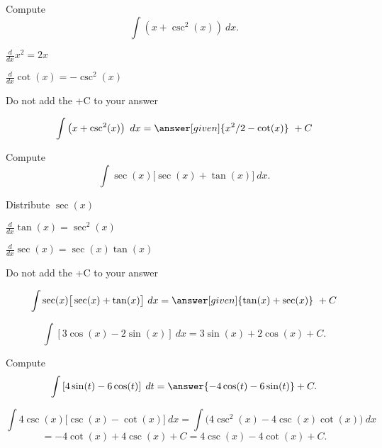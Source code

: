 \documentclass{ximera}
\begin{document}
\begin{problem} %
Compute
\[
\int \left(x + \csc^2(x) \right) \ dx.
\]

\begin{hint}
$\frac{d}{dx} x^2 = 2x$
\end{hint}
\begin{hint}
$\frac{d}{dx} \cot(x) = -\csc^2(x)$
\end{hint}
\begin{hint}
\begin{center}
Do not add the +C to your answer
\end{center}
\end{hint}

\[
\int \left(x + \csc^2(x) \right) \ dx =
\answer[given]{x^2 /2 - \cot(x)} \ +  C
\]
\end{problem}

\begin{problem} %
Compute
\[
\int \sec(x)\big[\sec(x) + \tan(x) \big] \ dx.
\]

\begin{hint}
Distribute $\sec(x)$
\end{hint}
\begin{hint}
$\frac{d}{dx} \tan(x) = \sec^2(x)$
\end{hint}
\begin{hint}
$\frac{d}{dx} \sec(x) = \sec(x)\tan(x)$
\end{hint}
\begin{hint}
\begin{center}
Do not add the +C to your answer
\end{center}
\end{hint}

\[
\int \sec(x)\big[\sec(x) + \tan(x) \big] \ dx =
\answer[given]{\tan(x) + \sec(x)} \ +  C
\]
\end{problem}



\begin{example} %
\[
\int \left[3\cos(x) - 2\sin(x)\right] \ dx = 3\sin(x) + 2\cos(x) + C.
\]
\end{example}


\begin{problem}
Compute
\[
\int \left[4\sin(t) - 6\cos(t)\right] \; dt = \answer{-4\cos(t) - 6\sin(t)} + C.
\]
\end{problem}

\begin{example} %
\[
\int 4\csc(x)\big[\csc(x) - \cot(x)\big] \ dx = \int \big(4\csc^2(x)  - 4\csc(x)\cot(x)\big) \ dx
\]
\[
 = -4\cot(x) + 4\csc(x) + C
= 4\csc(x) - 4 \cot(x) + C.
\]
\end{example}
\end{document}
